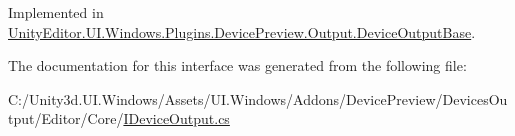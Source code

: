 Implemented in \hyperlink{class_unity_editor_1_1_u_i_1_1_windows_1_1_plugins_1_1_device_preview_1_1_output_1_1_device_output_base_a0c9f2688fbddc26c475f6c4ec0bde8bf}{Unity\+Editor.\+U\+I.\+Windows.\+Plugins.\+Device\+Preview.\+Output.\+Device\+Output\+Base}.



The documentation for this interface was generated from the following file\+:\begin{DoxyCompactItemize}
\item 
C\+:/\+Unity3d.\+U\+I.\+Windows/\+Assets/\+U\+I.\+Windows/\+Addons/\+Device\+Preview/\+Devices\+Output/\+Editor/\+Core/\hyperlink{_i_device_output_8cs}{I\+Device\+Output.\+cs}\end{DoxyCompactItemize}
